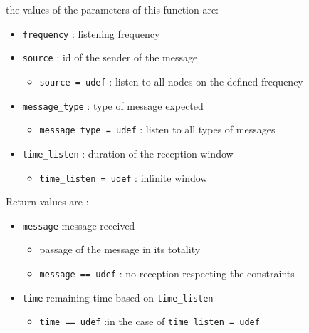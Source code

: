 \documentclass[conference]{IEEEtran}
\begin{document}
the values of the parameters of this function are:
\begin{itemize}
  \item \texttt{frequency} : listening frequency
  \item \texttt{source} : id of the sender of the message
  \begin{itemize}
    \item \texttt{source = udef} : listen to all nodes on the defined frequency
  \end{itemize}
  \item \texttt{message\_type} : type of message expected
  \begin{itemize}
    \item \texttt{message\_type = udef} : listen to all types of messages  \end{itemize}
  \item \texttt{time\_listen} : duration of the reception window
  \begin{itemize}
    \item \texttt{time\_listen = udef} :  infinite window \end{itemize}
\end{itemize}

Return values are :

\begin{itemize}
  \item \texttt{message} message received
  \begin{itemize}
    \item passage of the message in its totality
        \item \texttt{message == udef} : no reception respecting the constraints
  \end{itemize}
  \item \texttt{time} remaining time based on \texttt{time\_listen}
  \begin{itemize}
    \item \texttt{time == udef} :in the case of \texttt{time\_listen = udef}
  \end{itemize}
\end{itemize}
\newpage
\end{document}
